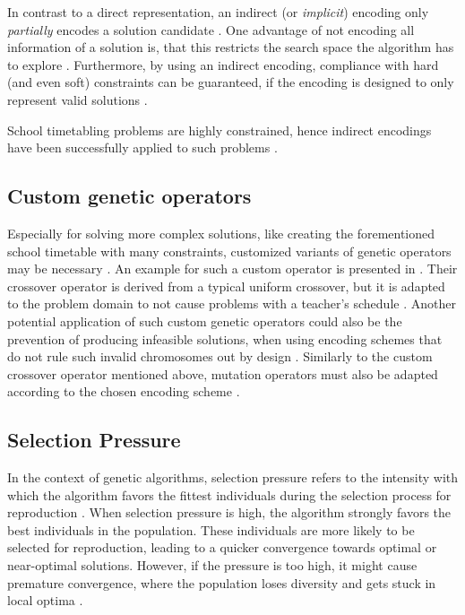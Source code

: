 \documentclass[sigconf]{acmart}
\begin{document}
In contrast to a direct representation, an indirect (or \textit{implicit})
encoding only \textit{partially} encodes a solution candidate \cite{Thanh2007}.
One advantage of not encoding all information of a solution is, that
this restricts the search space the algorithm has to explore \cite{Goos2002}.
Furthermore, by using an indirect encoding, compliance with hard (and even
soft) constraints can be guaranteed, if the encoding is designed to
only represent valid solutions \cite{Goos2002}.

School timetabling problems are highly constrained, hence indirect
encodings have been successfully applied to such problems \cite{Goos2002}.


\subsection{Custom genetic operators}
Especially for solving more complex solutions, like creating the forementioned
school timetable with many constraints, customized variants of genetic
operators may be necessary \cite{Beligiannis2009,Almeida2015}.
An example for such a custom operator is presented in \cite{Beligiannis2009}.
Their crossover operator is derived from a typical uniform crossover, but
it is adapted to the problem domain to not cause problems with a teacher's
schedule \cite{Beligiannis2009}.
Another potential application of such custom genetic operators could also be
the prevention of producing infeasible solutions, when using encoding schemes
that do not rule such invalid chromosomes out by design \cite{Elliman1995}.
%
Similarly to the custom crossover operator mentioned above,
mutation operators must also be adapted according to the chosen encoding
scheme \cite{Almeida2015}.



\subsection{Selection Pressure}
In the context of genetic algorithms, selection pressure refers to the
intensity with which the algorithm favors the fittest individuals during the
selection process for reproduction \cite{back1994selective, Affenzeller2009}.
%
When selection pressure is high, the algorithm strongly favors the best
individuals in the population. These individuals are more likely to be selected
for reproduction, leading to a quicker convergence towards optimal or
near-optimal solutions. However, if the pressure is too high, it might cause
premature convergence, where the population loses diversity and gets stuck in
local optima \cite{back1994selective}.
\end{document}
